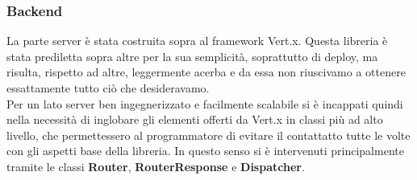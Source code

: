 	  
	\subsubsection{Backend}
	  La parte server è stata costruita sopra al framework Vert.x. Questa libreria è stata prediletta sopra altre per la sua semplicità, soprattutto di deploy, ma risulta, rispetto ad altre, leggermente acerba e da essa non riuscivamo a ottenere essattamente tutto ciò che desideravamo. 
	  \\
	  Per un lato server ben ingegnerizzato e facilmente scalabile si è incappati quindi nella necessità di inglobare gli elementi offerti da Vert.x in classi più ad alto livello, che permettessero al programmatore di evitare il contattatto tutte le volte con gli aspetti base della libreria. 
	  In questo senso si è intervenuti principalmente tramite le classi \textbf{Router}, \textbf{RouterResponse} e \textbf{Dispatcher}.
	  
